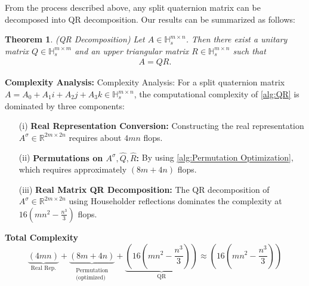 \documentclass[12pt]{article}
\newtheorem{theorem}{Theorem}[section]
\numberwithin{equation}{section}
\begin{document}
From the process described above, any split quaternion matrix can be decomposed into QR decomposition. Our results can be summarized as follows:
\begin{theorem}(QR Decomposition)
    Let $A \in \mathbb{H}_s^{m \times n}$. Then there exist a unitary matrix $Q \in \mathbb{H}_s^{m \times m}$ and an upper triangular matrix $R \in \mathbb{H}_s^{m \times n}$ such that
    \begin{eqnarray}\label{eq:split QR}
        A = Q R.
    \end{eqnarray}
\end{theorem}

\noindent \textbf{Complexity Analysis:}
{Complexity Analysis:} For a split quaternion matrix $A = A_0 + A_1i + A_2j + A_3k \in \mathbb{H}_s^{m \times n}$, the computational complexity of \cref{alg:QR} is dominated by three components:  

\begin{itemize}
\item[(i)] \textbf{Real Representation Conversion:}
Constructing the real representation $A^\sigma \in \mathbb{R}^{2m \times 2n}$ requires about $4mn$ flops. 

\item[(ii)] \textbf{Permutations on $A^\sigma, \widehat{Q}, \widehat{R}$:}
By using \cref{alg:Permutation Optimization},  which requires approximately  $(8m+4n)$ flops.

\item[(iii)] \textbf{Real Matrix QR Decomposition:}
The QR decomposition of $A^\sigma \in \mathbb{R}^{2m \times 2n}$ using Householder reflections dominates the complexity at $16(mn^2-\frac{n^3}{3})$ flops.
\end{itemize}

\noindent \textbf{Total Complexity}
$$
\underbrace{(4mn)}_{\text{Real Rep.}} + \underbrace{(8m+4n)}_{\substack{\text{Permutation} \\ \text{(optimized)}}} + \underbrace{(16(mn^2-\frac{n^3}{3}))}_{\text{QR}} \approx \boxed{(16(mn^2-\frac{n^3}{3}))}
$$  
\end{document}
